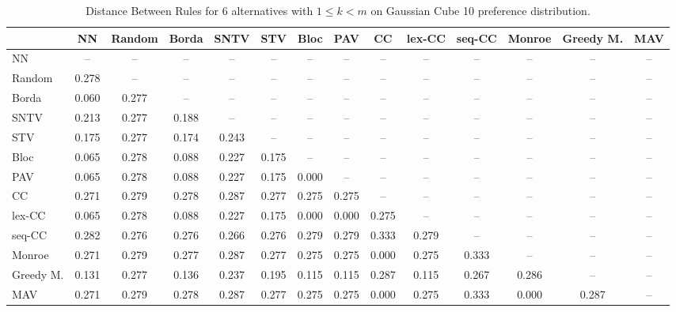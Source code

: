 
\begin{table*}
\centering
\begin{tabular}{lccccccccccccc}
\toprule
 & NN & Random & Borda & SNTV & STV & Bloc & PAV & CC & lex-CC & seq-CC & Monroe & Greedy M. & MAV \\
\midrule
NN & -- & -- & -- & -- & -- & -- & -- & -- & -- & -- & -- & -- & -- \\
Random & 0.278 & -- & -- & -- & -- & -- & -- & -- & -- & -- & -- & -- & -- \\
Borda & 0.060 & 0.277 & -- & -- & -- & -- & -- & -- & -- & -- & -- & -- & -- \\
SNTV & 0.213 & 0.277 & 0.188 & -- & -- & -- & -- & -- & -- & -- & -- & -- & -- \\
STV & 0.175 & 0.277 & 0.174 & 0.243 & -- & -- & -- & -- & -- & -- & -- & -- & -- \\
Bloc & 0.065 & 0.278 & 0.088 & 0.227 & 0.175 & -- & -- & -- & -- & -- & -- & -- & -- \\
PAV & 0.065 & 0.278 & 0.088 & 0.227 & 0.175 & 0.000 & -- & -- & -- & -- & -- & -- & -- \\
CC & 0.271 & 0.279 & 0.278 & 0.287 & 0.277 & 0.275 & 0.275 & -- & -- & -- & -- & -- & -- \\
lex-CC & 0.065 & 0.278 & 0.088 & 0.227 & 0.175 & 0.000 & 0.000 & 0.275 & -- & -- & -- & -- & -- \\
seq-CC & 0.282 & 0.276 & 0.276 & 0.266 & 0.276 & 0.279 & 0.279 & 0.333 & 0.279 & -- & -- & -- & -- \\
Monroe & 0.271 & 0.279 & 0.277 & 0.287 & 0.277 & 0.275 & 0.275 & 0.000 & 0.275 & 0.333 & -- & -- & -- \\
Greedy M. & 0.131 & 0.277 & 0.136 & 0.237 & 0.195 & 0.115 & 0.115 & 0.287 & 0.115 & 0.267 & 0.286 & -- & -- \\
MAV & 0.271 & 0.279 & 0.278 & 0.287 & 0.277 & 0.275 & 0.275 & 0.000 & 0.275 & 0.333 & 0.000 & 0.287 & -- \\
\bottomrule
\end{tabular}

\caption{Distance Between Rules for 6 alternatives with $1 \leq k < m$ on Gaussian Cube 10 preference distribution.}
\end{table*}
